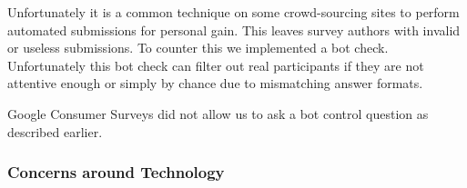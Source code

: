 \documentclass[twoside,letterpaper]{soups}
\begin{document}







Unfortunately it is a common technique on some crowd-sourcing sites to perform automated submissions for personal gain. This leaves survey authors with invalid or useless submissions. To counter this we implemented a bot check. Unfortunately this bot check can filter out real participants if they are not attentive enough or simply by chance due to mismatching answer formats.

Google Consumer Surveys did not allow us to ask a bot control question as described earlier.

\subsubsection{Concerns around Technology}
\end{document}
